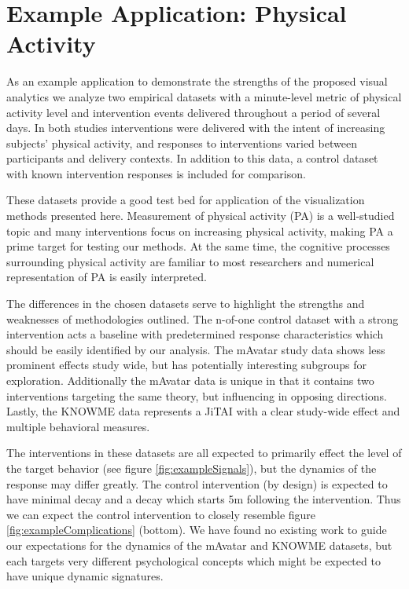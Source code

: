 \section{Example Application: Physical Activity}
As an example application to demonstrate the strengths of the proposed visual analytics we analyze two empirical datasets with a minute-level metric of physical activity level and intervention events delivered throughout a period of several days.
In both studies interventions were delivered with the intent of increasing subjects’ physical activity, and responses to interventions varied between participants and delivery contexts.
In addition to this data, a control dataset with known intervention responses is included for comparison.

These datasets provide a good test bed for application of the visualization methods presented here.
Measurement of physical activity (PA) is a well-studied topic and many interventions focus on increasing physical activity, making PA a prime target for testing our methods.
At the same time, the cognitive processes surrounding physical activity are familiar to most researchers and numerical representation of PA is easily interpreted.

The differences in the chosen datasets serve to highlight the strengths and weaknesses of methodologies outlined. 
The n-of-one control dataset with a strong intervention acts a baseline with predetermined response characteristics which should be easily identified by our analysis.
The mAvatar study data shows less prominent effects study wide, but has potentially interesting subgroups for exploration.
Additionally the mAvatar data is unique in that it contains two interventions targeting the same theory, but influencing in opposing directions.
Lastly, the KNOWME data represents a JiTAI with a clear study-wide effect and multiple behavioral measures.

The interventions in these datasets are all expected to primarily effect the level of the target behavior (see figure \ref{fig:exampleSignals}), but the dynamics of the response may differ greatly. 
The control intervention (by design) is expected to have minimal decay and a decay which starts 5m following the intervention. 
Thus we can expect the control intervention to closely resemble figure \ref{fig:exampleComplications} (bottom).
We have found no existing work to guide our expectations for the dynamics of the mAvatar and KNOWME datasets, but each targets very different psychological concepts which might be expected to have unique dynamic signatures.

